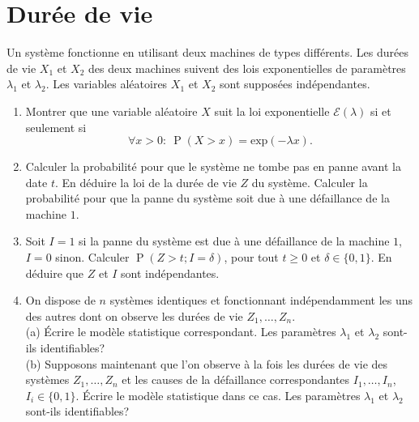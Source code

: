 \documentclass[a4paper,11pt,fleqn]{article}
\renewcommand{\P}{\ensuremath{\operatorname{P}}}
\newcommand{\1}{\ensuremath{\mathbbm{1}}}
\begin{document}
\section{Dur\'ee de vie}
Un syst\`eme fonctionne en utilisant deux machines de types
diff\'erents. Les dur\'ees de vie $X_1$ et $X_2$ des deux machines
suivent des lois exponentielles de param\`etres $\lambda_1$ et
$\lambda_2$. Les variables al\'eatoires $X_1$ et $X_2$ sont
suppos\'ees ind\'ependantes.
\begin{enumerate}
\item Montrer que une variable al\'eatoire $X$ suit la loi exponentielle $\mathcal{E}(\lambda)$ si et seulement si 
$$\forall x>0:  \  \P(X > x)=\text{exp}(-\lambda x).$$
\item Calculer la probabilit\'e pour que le syst\`eme ne tombe pas en panne
avant la date $t$. En d\'eduire la loi de la dur\'ee de vie $Z$ du
syst\`eme. Calculer la probabilit\'e pour que la panne du syst\`eme
soit due \`a une d\'efaillance de la machine $1$.
\item Soit $I = 1$ si la
panne du syst\`eme est due \`a une d\'efaillance de la machine $1$,
$I = 0$ sinon. Calculer $\P(Z > t; I = \delta)$, pour tout $t\geq 0$
et $\delta\in\{0,1\}$. En d\'eduire que $Z$ et $I$ sont
ind\'ependantes.
\item On dispose de $n$ syst\`emes identiques et fonctionnant
ind\'ependamment les uns des autres dont on observe les dur\'ees de
vie
$Z_1,\ldots,Z_n$.\\
(a) \'Ecrire le mod\`ele statistique correspondant. Les param\`etres 
$\lambda_1$ et $\lambda_2$ sont-ils identifiables?\\
(b) Supposons maintenant que l'on observe \`a la fois les dur\'ees de vie des syst\`emes $Z_1,\ldots,Z_n$ et
les causes de la d\'efaillance correspondantes $I_1,\dots,I_n$, $I_i\in\{0,1\}$.  \'Ecrire le mod\`ele statistique dans ce cas. Les param\`etres 
$\lambda_1$ et $\lambda_2$ sont-ils identifiables?

\end{enumerate}
\end{document}
